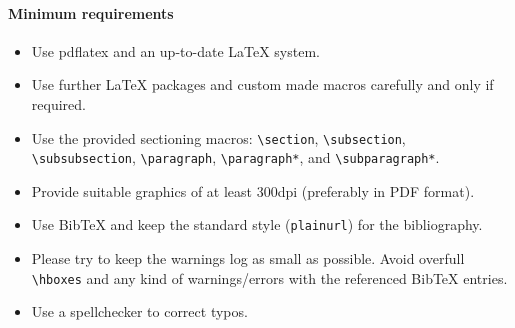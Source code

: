 \documentclass[a4paper,UKenglish,cleveref, autoref, thm-restate]{lipics-v2021}
\begin{document}
\paragraph*{Minimum requirements}

\begin{itemize}
\item Use pdflatex and an up-to-date \LaTeX{} system.
\item Use further \LaTeX{} packages and custom made macros carefully and only if required.
\item Use the provided sectioning macros: \verb+\section+, \verb+\subsection+, \verb+\subsubsection+, \linebreak \verb+\paragraph+, \verb+\paragraph*+, and \verb+\subparagraph*+.
\item Provide suitable graphics of at least 300dpi (preferably in PDF format).
\item Use BibTeX and keep the standard style (\verb+plainurl+) for the bibliography.
\item Please try to keep the warnings log as small as possible. Avoid overfull \verb+\hboxes+ and any kind of warnings/errors with the referenced BibTeX entries.
\item Use a spellchecker to correct typos.
\end{itemize}
\end{document}
